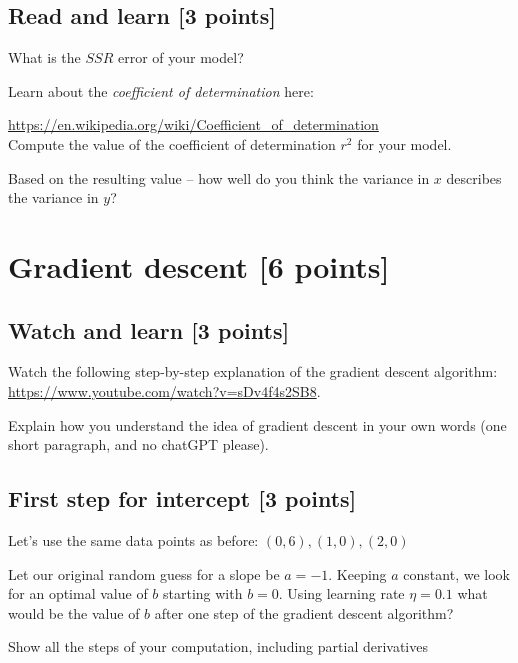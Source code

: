\documentclass{article}
\begin{document}
\subsection{Read and learn [3 points]}

What is the $SSR$ error of your model?


\noindent Learn about the \emph{coefficient of determination} here: 

\url{https://en.wikipedia.org/wiki/Coefficient_of_determination}\\

\noindent Compute the value of the coefficient of determination $r^2$ for your model.

\noindent Based on the resulting value -- how well do you think the variance in $x$ describes the variance in $y$? 


\newpage
\section{Gradient descent [6 points]}
\subsection{Watch and learn [3 points]}
Watch the following step-by-step explanation of the gradient descent algorithm:
\url{https://www.youtube.com/watch?v=sDv4f4s2SB8}.

Explain how you understand the idea of gradient descent in your own words (one short paragraph, and no chatGPT please).

\subsection{First step for intercept [3 points]}
Let's use the same data points as before: ${(0,6), (1,0),(2,0)}$

Let our original random guess for a slope be $a=-1$. Keeping $a$ constant, we look for an optimal value of $b$ starting with $b=0$. Using learning rate $\eta=0.1$ what would be the value of $b$ after one step of the gradient descent algorithm?

Show all the steps of your computation, including partial derivatives\\ 

 
\end{document}
